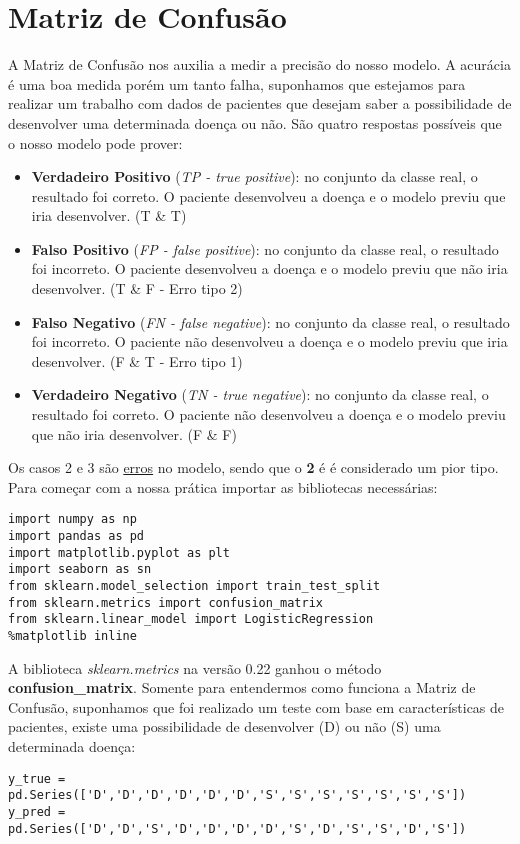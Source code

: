 \section{Matriz de Confusão}
A Matriz de Confusão nos auxilia a medir a precisão do nosso modelo. A acurácia é uma boa medida porém um tanto falha, suponhamos que estejamos para realizar um trabalho com dados de pacientes que desejam saber a possibilidade de desenvolver uma determinada doença ou não. São quatro respostas possíveis que o nosso modelo pode prover: \vspace{-1em}
\begin{itemize}
	\item \textbf{Verdadeiro Positivo} (\textit{TP - true positive}): no conjunto da classe real, o resultado foi correto. O paciente desenvolveu a doença e o modelo previu que iria desenvolver. (T \& T)
	\item \textbf{Falso Positivo} (\textit{FP - false positive}): no conjunto da classe real, o resultado foi incorreto. O paciente desenvolveu a doença e o modelo previu que não iria desenvolver. (T \& F - Erro tipo 2)
	\item \textbf{Falso Negativo} (\textit{FN - false negative}): no conjunto da classe real, o resultado foi incorreto. O paciente não desenvolveu a doença e o modelo previu que iria desenvolver. (F \& T - Erro tipo 1)
	\item \textbf{Verdadeiro Negativo} (\textit{TN - true negative}): no conjunto da classe real, o resultado foi correto. O paciente não desenvolveu a doença e o modelo previu que não iria desenvolver. (F \& F)
\end{itemize}

Os casos 2 e 3 são \underline{erros} no modelo, sendo que o \textbf{2} é é considerado um pior tipo. Para começar com a nossa prática importar as bibliotecas necessárias:
\begin{lstlisting}
import numpy as np
import pandas as pd
import matplotlib.pyplot as plt
import seaborn as sn
from sklearn.model_selection import train_test_split
from sklearn.metrics import confusion_matrix
from sklearn.linear_model import LogisticRegression
%matplotlib inline
\end{lstlisting}

A biblioteca \textit{sklearn.metrics} na versão 0.22 ganhou o método \textbf{confusion\_matrix}. Somente para entendermos como funciona a Matriz de Confusão, suponhamos que foi realizado um teste com base em características de pacientes, existe uma possibilidade de desenvolver (D) ou não (S) uma determinada doença:
\begin{lstlisting}
y_true = pd.Series(['D','D','D','D','D','D','S','S','S','S','S','S','S'])
y_pred = pd.Series(['D','D','S','D','D','D','D','S','D','S','S','D','S'])
\end{lstlisting}

